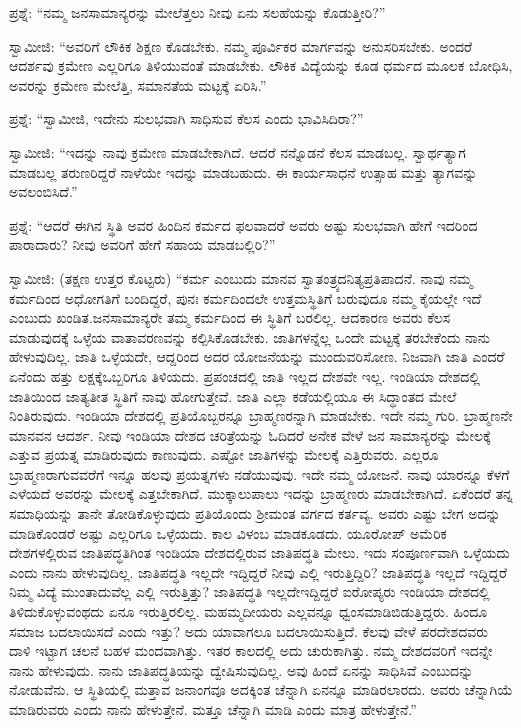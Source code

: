 ಪ್ರಶ್ನೆ: “ನಮ್ಮ ಜನಸಾಮಾನ್ಯರನ್ನು ಮೇಲೆತ್ತಲು ನೀವು ಏನು ಸಲಹೆಯನ್ನು ಕೊಡುತ್ತೀರಿ?”

ಸ್ವಾಮೀಜಿ: “ಅವರಿಗೆ ಲೌಕಿಕ ಶಿಕ್ಷಣ ಕೊಡಬೇಕು. ನಮ್ಮ ಪೂರ್ವಿಕರ ಮಾರ್ಗವನ್ನು ಅನುಸರಿಸಬೇಕು. ಅಂದರೆ ಆದರ್ಶವು ಕ್ರಮೇಣ ಎಲ್ಲರಿಗೂ ತಿಳಿಯುವಂತೆ ಮಾಡಬೇಕು. ಲೌಕಿಕ ವಿದ್ಯೆಯನ್ನು ಕೂಡ ಧರ್ಮದ ಮೂಲಕ ಬೋಧಿಸಿ, ಅವರನ್ನು ಕ್ರಮೇಣ ಮೇಲೆತ್ತಿ, ಸಮಾನತೆಯ ಮಟ್ಟಕ್ಕೆ ಏರಿಸಿ.”

ಪ್ರಶ್ನೆ: “ಸ್ವಾಮೀಜಿ, ಇದೇನು ಸುಲಭವಾಗಿ ಸಾಧಿಸುವ ಕೆಲಸ ಎಂದು ಭಾವಿಸಿದಿರಾ?”

\eject

ಸ್ವಾಮೀಜಿ: “ಇದನ್ನು ನಾವು ಕ್ರಮೇಣ ಮಾಡಬೇಕಾಗಿದೆ. ಆದರೆ ನನ್ನೊಡನೆ ಕೆಲಸ ಮಾಡಬಲ್ಲ. ಸ್ವಾರ್ಥತ್ಯಾಗ ಮಾಡಬಲ್ಲ ತರುಣರಿದ್ದರೆ ನಾಳೆಯೇ ಇದನ್ನು ಮಾಡಬಹುದು. ಈ ಕಾರ್ಯಸಾಧನೆ ಉತ್ಸಾಹ ಮತ್ತು ತ್ಯಾಗವನ್ನು ಅವಲಂಬಿಸಿದೆ.”

ಪ್ರಶ್ನೆ: “ಆದರೆ ಈಗಿನ ಸ್ಥಿತಿ ಅವರ ಹಿಂದಿನ ಕರ್ಮದ ಫಲವಾದರೆ ಅವರು ಅಷ್ಟು ಸುಲಭವಾಗಿ ಹೇಗೆ ಇದರಿಂದ ಪಾರಾದಾರು? ನೀವು ಅವರಿಗೆ ಹೇಗೆ ಸಹಾಯ ಮಾಡಬಲ್ಲಿರಿ?”

ಸ್ವಾಮೀಜಿ: (ತಕ್ಷಣ ಉತ್ತರ ಕೊಟ್ಟರು) “ಕರ್ಮ ಎಂಬುದು ಮಾನವ ಸ್ವಾತಂತ್ರ್ಯದ\break ನಿತ್ಯಪ್ರತಿಪಾದನೆ. ನಾವು ನಮ್ಮ ಕರ್ಮದಿಂದ ಅಧೋಗತಿಗೆ ಬಂದಿದ್ದರೆ, ಪುನಃ ಕರ್ಮದಿಂದಲೇ ಉತ್ತಮಸ್ಥಿತಿಗೆ ಬರುವುದೂ ನಮ್ಮ ಕೈಯಲ್ಲೇ ಇದೆ ಎಂಬುದು ಖಂಡಿತ.\break ಜನಸಾಮಾನ್ಯರೇ ತಮ್ಮ ಕರ್ಮದಿಂದ ಈ ಸ್ಥಿತಿಗೆ ಬರಲಿಲ್ಲ. ಆದಕಾರಣ ಅವರು ಕೆಲಸ ಮಾಡುವುದಕ್ಕೆ ಒಳ್ಳೆಯ ವಾತಾವರಣವನ್ನು ಕಲ್ಪಿಸಿಕೊಡಬೇಕು. ಜಾತಿಗಳನ್ನೆಲ್ಲ ಒಂದೇ ಮಟ್ಟಕ್ಕೆ ತರಬೇಕೆಂದು ನಾನು ಹೇಳುವುದಿಲ್ಲ. ಜಾತಿ ಒಳ್ಳೆಯದೇ, ಆದ್ದರಿಂದ ಅದರ ಯೋಜನೆಯನ್ನು ಮುಂದುವರಿಸೋಣ. ನಿಜವಾಗಿ ಜಾತಿ ಎಂದರೆ ಏನೆಂದು ಹತ್ತು ಲಕ್ಷಕ್ಕೆ\break ಒಬ್ಬರಿಗೂ ತಿಳಿಯದು. ಪ್ರಪಂಚದಲ್ಲಿ ಜಾತಿ ಇಲ್ಲದ ದೇಶವೇ ಇಲ್ಲ. ಇಂಡಿಯಾ ದೇಶದಲ್ಲಿ ಜಾತಿಯಿಂದ ಜಾತ್ಯತೀತ ಸ್ಥಿತಿಗೆ ನಾವು ಹೋಗುತ್ತೇವೆ. ಜಾತಿ ಎಲ್ಲಾ ಕಡೆಯಲ್ಲಿಯೂ ಈ ಸಿದ್ಧಾಂತದ ಮೇಲೆ ನಿಂತಿರುವುದು. ಇಂಡಿಯಾ ದೇಶದಲ್ಲಿ ಪ್ರತಿಯೊಬ್ಬರನ್ನೂ ಬ್ರಾಹ್ಮಣ\-ರನ್ನಾಗಿ ಮಾಡಬೇಕು. ಇದೇ ನಮ್ಮ ಗುರಿ. ಬ್ರಾಹ್ಮಣನೇ ಮಾನವನ ಆದರ್ಶ. ನೀವು ಇಂಡಿಯಾ ದೇಶದ ಚರಿತ್ರೆಯನ್ನು ಓದಿದರೆ ಅನೇಕ ವೇಳೆ ಜನ ಸಾಮಾನ್ಯರನ್ನು ಮೇಲಕ್ಕೆ ಎತ್ತುವ ಪ್ರಯತ್ನ ಮಾಡಿರುವುದು ಕಾಣುವುದು. ಎಷ್ಟೋ ಜಾತಿಗಳನ್ನು ಮೇಲಕ್ಕೆ ಎತ್ತಿರುವರು. ಎಲ್ಲರೂ ಬ್ರಾಹ್ಮಣರಾಗುವವರೆಗೆ ಇನ್ನೂ ಹಲವು ಪ್ರಯತ್ನಗಳು ನಡೆಯುವುವು. ಇದೇ ನಮ್ಮ ಯೋಜನೆ. ನಾವು ಯಾರನ್ನೂ ಕೆಳಗೆ ಎಳೆಯದೆ ಅವರನ್ನು ಮೇಲಕ್ಕೆ ಎತ್ತಬೇಕಾಗಿದೆ. ಮುಕ್ಕಾಲುಪಾಲು ಇದನ್ನು ಬ್ರಾಹ್ಮಣರು ಮಾಡಬೇಕಾಗಿದೆ. ಏಕೆಂದರೆ ತನ್ನ ಸಮಾಧಿಯನ್ನು ತಾನೇ ತೋಡಿಕೊಳ್ಳುವುದು ಪ್ರತಿಯೊಂದು ಶ‍್ರೀಮಂತ ವರ್ಗದ ಕರ್ತವ್ಯ. ಅವರು ಎಷ್ಟು ಬೇಗ ಅದನ್ನು ಮಾಡಿಕೊಂಡರೆ ಅಷ್ಟು ಎಲ್ಲರಿಗೂ ಒಳ್ಳೆಯದು. ಕಾಲ ವಿಳಂಬ ಮಾಡಕೂಡದು. ಯೂರೋಪ್​ ಅಮೆರಿಕ ದೇಶಗಳಲ್ಲಿರುವ ಜಾತಿಪದ್ಧತಿಗಿಂತ ಇಂಡಿಯಾ ದೇಶದಲ್ಲಿರುವ ಜಾತಿಪದ್ಧತಿ ಮೇಲು. ಇದು ಸಂಪೂರ್ಣವಾಗಿ ಒಳ್ಳೆಯದು ಎಂದು ನಾನು ಹೇಳುವುದಿಲ್ಲ. ಜಾತಿಪದ್ಧತಿ ಇಲ್ಲದೇ ಇದ್ದಿದ್ದರೆ ನೀವು ಎಲ್ಲಿ ಇರುತ್ತಿದ್ದಿರಿ? ಜಾತಿಪದ್ಧತಿ ಇಲ್ಲದೆ ಇದ್ದಿದ್ದರೆ ನಿಮ್ಮ ವಿದ್ಯೆ ಮುಂತಾದುವೆಲ್ಲ ಎಲ್ಲಿ ಇರುತ್ತಿತ್ತು? ಜಾತಿಪದ್ಧತಿ ಇಲ್ಲದೇ\break ಇದ್ದಿದ್ದರೆ ಐರೋಪ್ಯರು ಇಂಡಿಯಾ ದೇಶದಲ್ಲಿ ತಿಳಿದುಕೊಳ್ಳುವಂಥದು ಏನೂ ಇರುತ್ತಿರಲಿಲ್ಲ. ಮಹಮ್ಮದೀಯರು ಎಲ್ಲವನ್ನೂ ಧ್ವಂಸಮಾಡಿಬಿಡುತ್ತಿದ್ದರು. ಹಿಂದೂ ಸಮಾಜ ಬದಲಾಯಿಸದೆ ಎಂದು ಇತ್ತು? ಅದು ಯಾವಾಗಲೂ ಬದಲಾಯಿಸುತ್ತಿದೆ. ಕೆಲವು ವೇಳೆ ಪರದೇಶದವರು ದಾಳಿ ಇಟ್ಟಾಗ ಚಲನೆ ಬಹಳ ಮಂದವಾಗಿತ್ತು. ಇತರ ಕಾಲದಲ್ಲಿ ಅದು ಚುರುಕಾಗಿತ್ತು. ನಮ್ಮ ದೇಶದವರಿಗೆ ಇದನ್ನೇ ನಾನು ಹೇಳುವುದು. ನಾನು ಜಾತಿಪದ್ಧತಿಯನ್ನು ದ್ವೇಷಿಸುವುದಿಲ್ಲ. ಅವು ಹಿಂದೆ ಏನನ್ನು ಸಾಧಿಸಿವೆ ಎಂಬುದನ್ನು ನೋಡುವೆನು. ಆ ಸ್ಥಿತಿಯಲ್ಲಿ ಮತ್ತಾವ ಜನಾಂಗವೂ ಅದಕ್ಕಿಂತ ಚೆನ್ನಾಗಿ ಏನನ್ನೂ ಮಾಡಿರಲಾರದು. ಅವರು ಚೆನ್ನಾಗಿಯೆ ಮಾಡಿರುವರು ಎಂದು ನಾನು ಹೇಳುತ್ತೇನೆ. ಮತ್ತೂ ಚೆನ್ನಾಗಿ ಮಾಡಿ ಎಂದು ಮಾತ್ರ ಹೇಳುತ್ತೇನೆ.”

